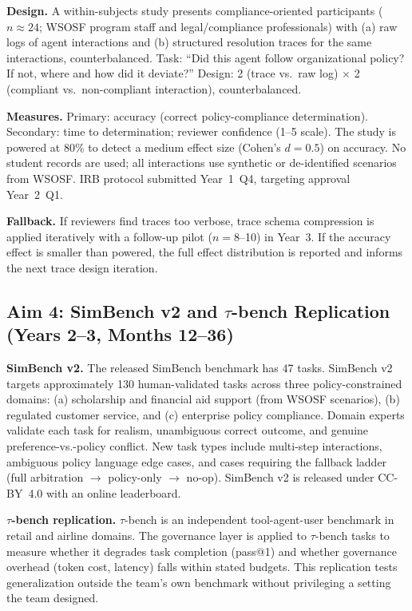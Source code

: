 \documentclass[11pt]{article}
\begin{document}
\textbf{Design.} A within-subjects study presents compliance-oriented participants ($n \approx 24$; WSOSF program staff and legal/compliance professionals) with (a) raw logs of agent interactions and (b) structured resolution traces for the same interactions, counterbalanced. Task: ``Did this agent follow organizational policy? If not, where and how did it deviate?'' Design: 2 (trace vs.\ raw log) $\times$ 2 (compliant vs.\ non-compliant interaction), counterbalanced.

\textbf{Measures.} Primary: accuracy (correct policy-compliance determination). Secondary: time to determination; reviewer confidence (1--5 scale). The study is powered at 80\% to detect a medium effect size (Cohen's $d = 0.5$) on accuracy. No student records are used; all interactions use synthetic or de-identified scenarios from WSOSF. IRB protocol submitted Year~1~Q4, targeting approval Year~2~Q1.

\textbf{Fallback.} If reviewers find traces too verbose, trace schema compression is applied iteratively with a follow-up pilot ($n = 8$--10) in Year~3. If the accuracy effect is smaller than powered, the full effect distribution is reported and informs the next trace design iteration.

\subsection{Aim 4: SimBench v2 and $\tau$-bench Replication (Years 2--3, Months 12--36)}

\textbf{SimBench v2.} The released SimBench benchmark has 47 tasks. SimBench v2 targets approximately 130 human-validated tasks across three policy-constrained domains: (a) scholarship and financial aid support (from WSOSF scenarios), (b) regulated customer service, and (c) enterprise policy compliance. Domain experts validate each task for realism, unambiguous correct outcome, and genuine preference-vs.-policy conflict. New task types include multi-step interactions, ambiguous policy language edge cases, and cases requiring the fallback ladder (full arbitration $\to$ policy-only $\to$ no-op). SimBench v2 is released under CC-BY~4.0 with an online leaderboard.

\textbf{$\tau$-bench replication.} $\tau$-bench \citep{yao2024tau} is an independent tool-agent-user benchmark in retail and airline domains. The governance layer is applied to $\tau$-bench tasks to measure whether it degrades task completion (pass@1) and whether governance overhead (token cost, latency) falls within stated budgets. This replication tests generalization outside the team's own benchmark without privileging a setting the team designed.
\end{document}
